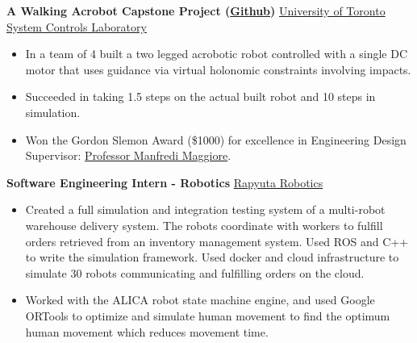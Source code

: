 \documentclass[10pt, a4paper]{cv}
\begin{document}
{	\textbf{A Walking Acrobot  Capstone Project (\href{https://github.com/Vuwij/acrobot}{Github})} \hfill \href{https://www.control.utoronto.ca/}{University of Toronto System Controls Laboratory}
	\begin{itemize}
		\item In a team of 4 built a two legged acrobotic robot controlled with a single DC motor that uses guidance via virtual holonomic constraints involving impacts.
		\item Succeeded in taking 1.5 steps on the actual built robot and 10 steps in simulation.
		\item Won the Gordon Slemon Award (\$1000) for excellence in Engineering Design\\ Supervisor: \href{https://www.control.utoronto.ca/~maggiore/}{Professor Manfredi Maggiore}.
	\end{itemize}

	\textbf{Software Engineering Intern - Robotics} \hfill \href{https://www.rapyuta-robotics.com}{Rapyuta Robotics}
	\begin{itemize}
		\item Created a full simulation and integration testing system of a multi-robot warehouse delivery system. The robots coordinate with workers to fulfill orders retrieved from an inventory management system. Used ROS and C++ to write the simulation framework. Used docker and cloud infrastructure to simulate 30 robots communicating and fulfilling orders on the cloud.
		\item Worked with the ALICA robot state machine engine, and used Google ORTools to optimize and simulate human movement to find the optimum human movement which reduces movement time.
	\end{itemize}

%
\pagebreak
}
\end{document}
